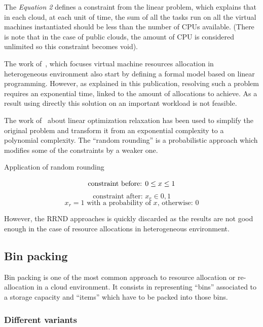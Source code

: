 The \textit{Equation 2} defines a constraint from the linear problem, which
explains that in each cloud, at each unit of time, the sum of all the tasks run
on all the virtual machines instantiated should be less than the number of CPUs
available.  (There is note that in the case of public clouds, the amount of CPU
is considered unlimited so this constraint becomes void).

\vspace{1em}

The work of~\cite*{allocationHeterogeneous}, which
focuses virtual machine resources allocation in heterogeneous
environment also start by defining a formal
model based on linear programming. However, as explained in this publication,
resolving such a problem requires an exponential time, linked to the amount of
allocations to achieve. As a result using directly this solution on an
important workload is not feasible.

\vspace{1em}

The work of~\cite*{mathsRrndlp} about linear optimization
relaxation has been used to simplify the original problem
and transform it from an exponential complexity to a polynomial complexity. The
“random rounding” is a probabilistic approach which modifies some of the
constraints by a weaker one.

\begin{figequation}
	\caption{Application of random rounding}
	\[
		\text{constraint before: } 0 \leq x \leq 1 \\
	\]
	\[
		\text{constraint after: } x_r \in {0, 1}
	\]
	\[
		x_r = 1 \text{ with a probability of $x$, otherwise: $0$}
	\]
\end{figequation}

However, the RRND approaches is quickly discarded as the results are not good
enough in the case of resource allocations in heterogeneous environment.

\subsection{Bin packing}

Bin packing is one of the most common approach to resource allocation or
re-allocation in a cloud environment. It consists in representing “bins”
associated to a storage capacity and “items” which have to be packed into
those bins.

\subsubsection{Different variants}

